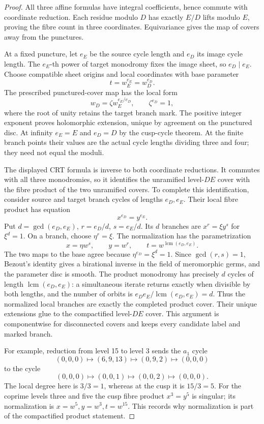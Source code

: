 \begin{proof}
All three affine formulas have integral coefficients, hence commute with
coordinate reduction. Each residue modulo $D$ has exactly $E/D$ lifts
modulo $E$, proving the fibre count in three coordinates. Equivariance
gives the map of covers away from the punctures.

At a fixed puncture, let $e_E$ be the source cycle length and $e_D$ its
image cycle length. The $e_E$-th power of target monodromy fixes the
image sheet, so $e_D\mid e_E$. Choose compatible sheet origins and
local coordinates with base parameter
\[
 t=w_E^{e_E}=w_D^{e_D}.
\]
The prescribed punctured-cover map has the local form
\[
 w_D=\zeta w_E^{e_E/e_D},\qquad \zeta^{e_D}=1,
\]
where the root of unity retains the target branch mark. The positive
integer exponent proves holomorphic extension, unique by agreement on
the punctured disc. At infinity $e_E=E$ and $e_D=D$ by the cusp-cycle
theorem. At the finite branch points their values are the actual cycle
lengths dividing three and four; they need not equal the moduli.

The displayed CRT formula is inverse to both coordinate reductions.
It commutes with all three monodromies, so it identifies the unramified
level-$DE$ cover with the fibre product of the two unramified covers.
To complete this identification, consider source and target branch
cycles of lengths $e_D,e_E$. Their local fibre product has equation
\[
 x^{e_D}=y^{e_E}.
\]
Put $d=\gcd(e_D,e_E)$, $r=e_D/d$, $s=e_E/d$. Its $d$ branches are
$x^r=\xi y^s$ for $\xi^d=1$. On a branch, choose $\eta^r=\xi$.
The normalization has the parametrization
\[
 x=\eta w^s,\qquad y=w^r,\qquad
 t=w^{\operatorname{lcm}(e_D,e_E)}.
\]
The two maps to the base agree because $\eta^{e_D}=\xi^d=1$.
Since $\gcd(r,s)=1$, Bezout's identity gives a birational inverse in
the field of meromorphic germs, and the parameter disc is smooth.
The product monodromy has precisely $d$ cycles of length
$\operatorname{lcm}(e_D,e_E)$: a simultaneous iterate returns exactly
when divisible by both lengths, and the number of orbits is
$e_De_E/\operatorname{lcm}(e_D,e_E)=d$.
Thus the normalized local branches are exactly the completed product
cover. Their unique extensions glue to the compactified level-$DE$
cover. This argument is componentwise for disconnected covers and
keeps every candidate label and marked branch.

For example, reduction from level 15 to level 3 sends the $a_1$ cycle
\[
 (0,0,0)\mapsto(6,9,13)\mapsto(0,9,2)\mapsto(0,0,0)
\]
to the cycle
\[
 (0,0,0)\mapsto(0,0,1)\mapsto(0,0,2)\mapsto(0,0,0).
\]
The local degree here is $3/3=1$, whereas at the cusp it is $15/3=5$.
For the coprime levels three and five the cusp fibre product
$x^3=y^5$ is singular; its normalization is
$x=w^5,y=w^3,t=w^{15}$. This records why normalization is part of
the compactified product statement.
\end{proof}
